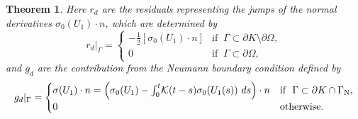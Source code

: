 \documentclass{amsart}
\numberwithin{equation}{section}
\newtheorem{theorem}{Theorem}
\theoremstyle{definition}
\begin{document}
\begin{theorem}
Here $r_d$ are the residuals representing the jumps of the normal
derivatives $\sigma_0(U_1)\cdot n$, which are determined by
\begin{equation}   \label{rh}
  r_d|_\Gamma =
  \begin{cases}
    -\frac{1}{2}[\sigma_0(U_1)\cdot n]
     &\text{if }\ \Gamma\subset\partial K
       \setminus\partial\Omega,\\
    0&\text{if }\ \Gamma\subset \partial\Omega,
  \end{cases}
\end{equation}
and $g_d$ are the contribution from the Neumann boundary condition 
defined by
\begin{equation}   \label{gh}
  g_d|_\Gamma =
  \begin{cases}
    \sigma(U_1)\cdot n
      =\Big(\sigma_0(U_1)-\int_0^t\!{\mathcal K}(t-s)\sigma_0(U_1(s))\ ds\Big)\cdot n
      &\text{if }\ \Gamma\subset\partial K\cap\Gamma_{\text N},\\
    0&\text{otherwise}.
  \end{cases}
\end{equation}
\end{theorem}
\end{document}
